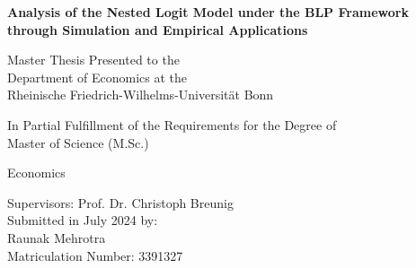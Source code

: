\documentclass[a4paper,11pt]{article}
\begin{document}
\begin{titlepage}


\begin{center}
    \vspace*{2cm}    
    \Large
    \textbf{Analysis of the Nested Logit Model under the BLP Framework through Simulation and Empirical Applications}
        
    \vspace{3cm}
    \large
    Master Thesis Presented to the \\
    \vspace{0.2cm}
    Department of Economics at the\\
    \vspace{0.2cm}
    Rheinische Friedrich-Wilhelms-Universität Bonn
        
    \vspace{1.5cm}

    In Partial Fulfillment of the Requirements for the Degree of\\ 
    \vspace{0.2cm}
    Master of Science (M.Sc.)
    
    \vspace{2cm}
    Economics
    
    \vspace{2cm}
    \large
    Supervisors: Prof. Dr. Christoph Breunig \\
    \vspace{1cm}
    Submitted in July 2024 by:\\
    Raunak Mehrotra\\
    Matriculation Number: 3391327
\end{center}
\end{titlepage}

\vspace*{2cm}

\thispagestyle{empty}
\tableofcontents
\hypersetup{hypertexnames=false}
\newpage

\clearpage
{}
\setcounter{page}{1}
\end{document}
